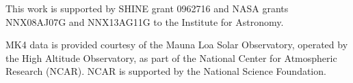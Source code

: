 \documentclass[preprint2]{aastex}
\begin{document}
\begin{acknowledgements}
This work is supported by SHINE grant 0962716 and NASA grants NNX08AJ07G and NNX13AG11G to the Institute for Astronomy.

MK4 data is provided courtesy of the Mauna Loa Solar Observatory, operated by the High Altitude Observatory, as part of the National Center for Atmospheric Research (NCAR). NCAR is supported by the National Science Foundation.

\end{acknowledgements}






\end{document}
